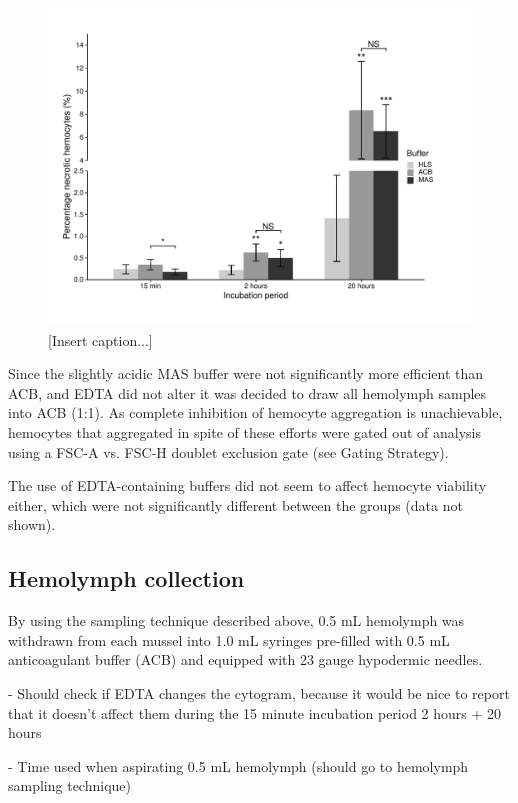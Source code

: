 \begin{figure}[!ht]
    \centering
    \includegraphics[width=1.0\textwidth]{figures/Method development/Buffer viability bargraph final.pdf}
    \caption{[Insert caption...]}
    \label{fig:BufferViability}
\end{figure}

Since the slightly acidic MAS buffer were not significantly more efficient than ACB, and EDTA did not alter it was decided to draw all hemolymph samples into ACB (1:1). As complete inhibition of hemocyte aggregation is unachievable, hemocytes that aggregated in spite of these efforts were gated out of analysis using a FSC-A vs. FSC-H doublet exclusion gate (see Gating Strategy).

The use of EDTA-containing buffers did not seem to affect hemocyte viability either, which were not significantly different between the groups (data not shown). 

\subsection{Hemolymph collection}
By using the sampling technique described above, 0.5 mL hemolymph was withdrawn from each mussel into 1.0 mL syringes pre-filled with 0.5 mL anticoagulant buffer (ACB) and equipped with 23 gauge hypodermic needles.

- Should check if EDTA changes the cytogram, because it would be nice to report that it doesn't affect them during the 15 minute incubation period 2 hours + 20 hours

- Time used when aspirating 0.5 mL hemolymph (should go to hemolymph sampling technique)

